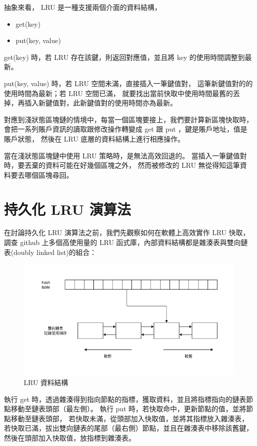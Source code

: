 抽象來看， LRU 是一種支援兩個介面的資料結構，

\begin{itemize}
  \item get(key)
  \item put(key, value)
\end{itemize}

get(key) 時，若 LRU 存在該鍵，則返回對應值，並且將 key 的使用時間調整到最新。

put(key, value) 時，若 LRU 空間未滿，直接插入一筆鍵值對，
這筆新鍵值對的的使用時間為最新；若 LRU 空間已滿，
就要找出當前快取中使用時間最舊的丟掉，再插入新鍵值對，此新鍵值對的使用時間亦為最新。

對應到淺狀態區塊鏈的情境中，每當一個區塊要接上，我們要計算新區塊快取時，
會把一系列賬戶資訊的讀取跟修改操作轉變成 get 跟 put ，鍵是賬戶地址，值是賬戶狀態，
然後在 LRU 底層的資料結構上進行相應操作。

當在淺狀態區塊鏈中使用 LRU 策略時，是無法高效回退的。
當插入一筆鍵值對時，要丟棄的資料可能在好幾個區塊之外，
然而被修改的 LRU 無從得知這筆資料要去哪個區塊尋回。

\section{持久化 LRU 演算法}
在討論持久化 LRU 演算法之前，我們先觀察如何在軟體上高效實作 LRU 快取，
調查 github 上多個高使用量的 LRU 函式庫，內部資料結構都是雜湊表與雙向鏈表(doubly linked list)的組合：

\begin{figure}[h]
\includegraphics[width=\textwidth]{LRU}
\caption{LRU 資料結構}
\end{figure}


執行 get 時，透過雜湊得到指向節點的指標，獲取資料，並且將指標指向的鏈表節點移動至鏈表頭部（最左側）。
執行 put 時，若快取命中，更新節點的值，並將節點移動至鏈表頭部，
若快取未滿，從頭部加入快取值，並將其指標放入雜湊表，
若快取已滿，拔出雙向鏈表的尾部（最右側）節點，並且在雜湊表中移除該舊鍵，
然後在頭部加入快取值，放指標到雜湊表。

